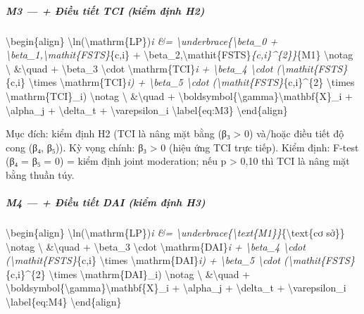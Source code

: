 \documentclass[12pt,a4paper]{article}
\begin{document}
\hypertarget{m3---ux111iux1ec1u-tiux1ebft-tci-kiux1ec3m-ux111ux1ecbnh-h2}{%
\subparagraph{M3 --- + Điều tiết TCI (kiểm định
H2)}\label{m3---ux111iux1ec1u-tiux1ebft-tci-kiux1ec3m-ux111ux1ecbnh-h2}}

\textbackslash begin\{align\}
\textbackslash ln(\textbackslash mathrm\{LP\})\emph{i \&=
\textbackslash underbrace\{\textbackslash beta\_0 +
\textbackslash beta\_1,\textbackslash mathit\{FSTS\}}\{c,i\} +
\textbackslash beta\_2,\textbackslash mathit\{FSTS\}\emph{\{c,i\}\^{}\{2\}\}}\{M1\}
\textbackslash notag \textbackslash{} \&\textbackslash quad +
\textbackslash beta\_3 \textbackslash cdot
\textbackslash mathrm\{TCI\}\emph{i + \textbackslash beta\_4
\textbackslash cdot (\textbackslash mathit\{FSTS\}}\{c,i\}
\textbackslash times \textbackslash mathrm\{TCI\}\emph{i) +
\textbackslash beta\_5 \textbackslash cdot
(\textbackslash mathit\{FSTS\}}\{c,i\}\^{}\{2\} \textbackslash times
\textbackslash mathrm\{TCI\}\_i) \textbackslash notag \textbackslash{}
\&\textbackslash quad +
\textbackslash boldsymbol\{\textbackslash gamma\}\textquotesingle\textbackslash mathbf\{X\}\_i
+ \textbackslash alpha\_j + \textbackslash delta\_t +
\textbackslash varepsilon\_i \textbackslash label\{eq:M3\}
\textbackslash end\{align\}

Mục đích: kiểm định H2 (TCI là nâng mặt bằng (β₃ \textgreater{} 0)
và/hoặc điều tiết độ cong (β₄, β₅)). Kỳ vọng chính: β₃ \textgreater{} 0
(hiệu ứng TCI trực tiếp). Kiểm định: F-test (β₄ = β₅ = 0) = kiểm định
joint moderation; nếu p \textgreater{} 0,10 thì TCI là nâng mặt bằng
thuần túy.

\hypertarget{m4---ux111iux1ec1u-tiux1ebft-dai-kiux1ec3m-ux111ux1ecbnh-h3}{%
\subparagraph{M4 --- + Điều tiết DAI (kiểm định
H3)}\label{m4---ux111iux1ec1u-tiux1ebft-dai-kiux1ec3m-ux111ux1ecbnh-h3}}

\textbackslash begin\{align\}
\textbackslash ln(\textbackslash mathrm\{LP\})\emph{i \&=
\textbackslash underbrace\{\textbackslash text\{M1\}\}}\{\textbackslash text\{cơ
sở\}\} \textbackslash notag \textbackslash{} \&\textbackslash quad +
\textbackslash beta\_3 \textbackslash cdot
\textbackslash mathrm\{DAI\}\emph{i + \textbackslash beta\_4
\textbackslash cdot (\textbackslash mathit\{FSTS\}}\{c,i\}
\textbackslash times \textbackslash mathrm\{DAI\}\emph{i) +
\textbackslash beta\_5 \textbackslash cdot
(\textbackslash mathit\{FSTS\}}\{c,i\}\^{}\{2\} \textbackslash times
\textbackslash mathrm\{DAI\}\_i) \textbackslash notag \textbackslash{}
\&\textbackslash quad +
\textbackslash boldsymbol\{\textbackslash gamma\}\textquotesingle\textbackslash mathbf\{X\}\_i
+ \textbackslash alpha\_j + \textbackslash delta\_t +
\textbackslash varepsilon\_i \textbackslash label\{eq:M4\}
\textbackslash end\{align\}
\end{document}
